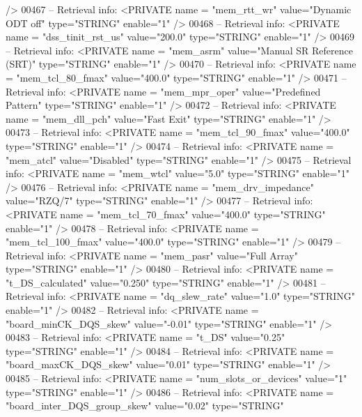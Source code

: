 \begin{DoxyCode}
{{       />}
00467 \textcolor{keyword}{-- Retrieval info:      <PRIVATE name = "mem\_rtt\_wr" value="Dynamic ODT off"  type="STRING"  enable="1" />}
00468 \textcolor{keyword}{-- Retrieval info:      <PRIVATE name = "dss\_tinit\_rst\_us" value="200.0"  type="STRING"  enable="1" />}
00469 \textcolor{keyword}{-- Retrieval info:      <PRIVATE name = "mem\_asrm" value="Manual SR Reference (SRT)"  type="STRING" 
       enable="1" />}
00470 \textcolor{keyword}{-- Retrieval info:      <PRIVATE name = "mem\_tcl\_80\_fmax" value="400.0"  type="STRING"  enable="1" />}
00471 \textcolor{keyword}{-- Retrieval info:      <PRIVATE name = "mem\_mpr\_oper" value="Predefined Pattern"  type="STRING" 
       enable="1" />}
00472 \textcolor{keyword}{-- Retrieval info:      <PRIVATE name = "mem\_dll\_pch" value="Fast Exit"  type="STRING"  enable="1" />}
00473 \textcolor{keyword}{-- Retrieval info:      <PRIVATE name = "mem\_tcl\_90\_fmax" value="400.0"  type="STRING"  enable="1" />}
00474 \textcolor{keyword}{-- Retrieval info:      <PRIVATE name = "mem\_atcl" value="Disabled"  type="STRING"  enable="1" />}
00475 \textcolor{keyword}{-- Retrieval info:      <PRIVATE name = "mem\_wtcl" value="5.0"  type="STRING"  enable="1" />}
00476 \textcolor{keyword}{-- Retrieval info:      <PRIVATE name = "mem\_drv\_impedance" value="RZQ/7"  type="STRING"  enable="1" />}
00477 \textcolor{keyword}{-- Retrieval info:      <PRIVATE name = "mem\_tcl\_70\_fmax" value="400.0"  type="STRING"  enable="1" />}
00478 \textcolor{keyword}{-- Retrieval info:      <PRIVATE name = "mem\_tcl\_100\_fmax" value="400.0"  type="STRING"  enable="1" />}
00479 \textcolor{keyword}{-- Retrieval info:      <PRIVATE name = "mem\_pasr" value="Full Array"  type="STRING"  enable="1" />}
00480 \textcolor{keyword}{-- Retrieval info:      <PRIVATE name = "t\_DS\_calculated" value="0.250"  type="STRING"  enable="1" />}
00481 \textcolor{keyword}{-- Retrieval info:      <PRIVATE name = "dq\_slew\_rate" value="1.0"  type="STRING"  enable="1" />}
00482 \textcolor{keyword}{-- Retrieval info:      <PRIVATE name = "board\_minCK\_DQS\_skew" value="-0.01"  type="STRING"  enable="1" />}
00483 \textcolor{keyword}{-- Retrieval info:      <PRIVATE name = "t\_DS" value="0.25"  type="STRING"  enable="1" />}
00484 \textcolor{keyword}{-- Retrieval info:      <PRIVATE name = "board\_maxCK\_DQS\_skew" value="0.01"  type="STRING"  enable="1" />}
00485 \textcolor{keyword}{-- Retrieval info:      <PRIVATE name = "num\_slots\_or\_devices" value="1"  type="STRING"  enable="1" />}
00486 \textcolor{keyword}{-- Retrieval info:      <PRIVATE name = "board\_inter\_DQS\_group\_skew" value="0.02"  type="STRING" 
}}
\end{DoxyCode}
